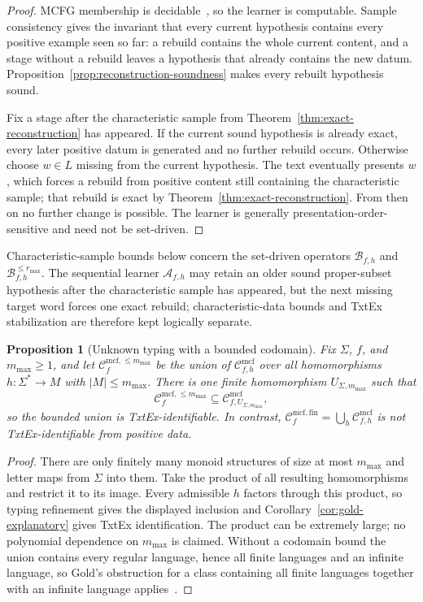 \documentclass[11pt]{article}
\numberwithin{equation}{section}
\theoremstyle{plain}
\newtheorem{proposition}[theorem]{Proposition}
\theoremstyle{definition}
\theoremstyle{remark}
\newcommand{\Cmcf}[2]{\mathcal{C}^{\mathrm{mcf}}_{#1,#2}}
\newcommand{\Cboundedtyping}[2]{\mathcal{C}^{\mathrm{mcf},\le #2}_{#1}}
\newcommand{\Calltyping}[1]{\mathcal{C}^{\mathrm{mcf},\mathrm{fin}}_{#1}}
\begin{document}
\begin{proof}
MCFG membership is decidable~\cite{SekiEtAl1991}, so the learner is
computable.  Sample consistency gives the invariant that every current
hypothesis contains every positive example seen so far: a rebuild contains the
whole current content, and a stage without a rebuild leaves a hypothesis that
already contains the new datum.  Proposition~\ref{prop:reconstruction-soundness}
makes every rebuilt hypothesis sound.

Fix a stage after the characteristic sample from
Theorem~\ref{thm:exact-reconstruction} has appeared.  If the current sound
hypothesis is already exact, every later positive datum is generated and no
further rebuild occurs.  Otherwise choose $w\in L$ missing from the current
hypothesis.  The text eventually presents $w$, which forces a rebuild from
positive content still containing the characteristic sample; that rebuild is
exact by Theorem~\ref{thm:exact-reconstruction}.  From then on no further
change is possible.  The learner is generally presentation-order-sensitive and
need not be set-driven.
\end{proof}

Characteristic-sample bounds below concern the set-driven operators
$\mathcal B_{f,h}$ and $\mathcal B_{f,h}^{\le r_{\max}}$.  The sequential
learner $\mathcal A_{f,h}$ may retain an older sound proper-subset hypothesis
after the characteristic sample has appeared, but the next missing target word
forces one exact rebuild; characteristic-data bounds and TxtEx stabilization
are therefore kept logically separate.

\begin{proposition}[Unknown typing with a bounded codomain]
\label{prop:bounded-unknown-typing}
Fix $\Sigma$, $f$, and $m_{\max}\ge1$, and let
$\Cboundedtyping{f}{m_{\max}}$ be the union of $\Cmcf{f}{h}$ over all
homomorphisms $h:\Sigma^*\to M$ with $|M|\le m_{\max}$.  There is one finite
homomorphism $U_{\Sigma,m_{\max}}$ such that
\[
 \Cboundedtyping{f}{m_{\max}}
 \subseteq \Cmcf{f}{U_{\Sigma,m_{\max}}},
\]
so the bounded union is TxtEx-identifiable.  In contrast,
$\Calltyping{f}=\bigcup_h\Cmcf{f}{h}$ is not TxtEx-identifiable from positive
data.
\end{proposition}

\begin{proof}
There are only finitely many monoid structures of size at most $m_{\max}$ and
letter maps from $\Sigma$ into them.  Take the product of all resulting
homomorphisms and restrict it to its image.  Every admissible $h$ factors
through this product, so typing refinement gives the displayed inclusion and
Corollary~\ref{cor:gold-explanatory} gives TxtEx identification.  The product
can be extremely large; no polynomial dependence on $m_{\max}$ is claimed.
Without a codomain bound the union contains every regular language, hence all
finite languages and an infinite language, so Gold's obstruction for a class containing all finite languages together with an
infinite language applies~\cite{Gold1967}.
\end{proof}
\end{document}
